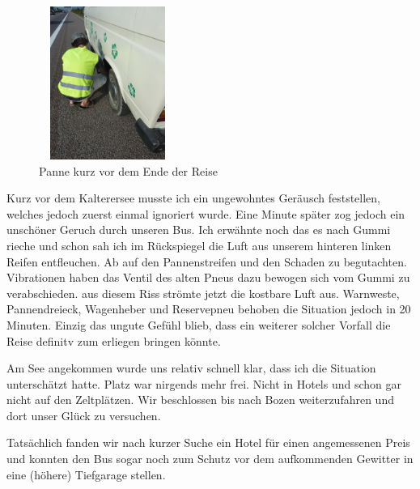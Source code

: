 \begin{figure} 
  \begin{centering}
    \includegraphics[width=0.4\textwidth, height=5cm, keepaspectratio]{../Bilder/Sommer2012/105.jpg}
    \caption{Panne kurz vor dem Ende der Reise}
  \end{centering}
\end{figure} 

Kurz vor dem Kalterersee musste ich ein ungewohntes Geräusch feststellen, welches jedoch zuerst einmal ignoriert wurde.
Eine Minute später zog jedoch ein unschöner Geruch durch unseren Bus.
Ich erwähnte noch das es nach Gummi rieche und schon sah ich im Rückspiegel die Luft aus unserem hinteren linken Reifen entfleuchen.
Ab auf den Pannenstreifen und den Schaden zu begutachten.
Vibrationen haben das Ventil des alten Pneus dazu bewogen sich vom Gummi zu verabschieden.
aus diesem Riss strömte jetzt die kostbare Luft aus.
Warnweste, Pannendreieck, Wagenheber und Reservepneu behoben die Situation jedoch in 20 Minuten.
Einzig das ungute Gefühl blieb, dass ein weiterer solcher Vorfall die Reise definitv zum erliegen bringen könnte.

Am See angekommen wurde uns relativ schnell klar, dass ich die Situation unterschätzt hatte.
Platz war nirgends mehr frei.
Nicht in Hotels und schon gar nicht auf den Zeltplätzen.
Wir beschlossen bis nach Bozen weiterzufahren und dort unser Glück zu versuchen.

Tatsächlich fanden wir nach kurzer Suche ein Hotel für einen angemessenen Preis und konnten den Bus sogar noch zum Schutz vor dem aufkommenden Gewitter in eine (höhere) Tiefgarage stellen.

